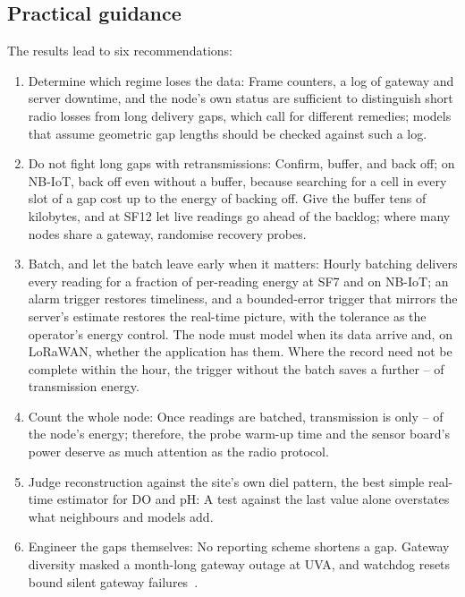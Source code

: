 \subsection{Practical guidance}
\label{sec:disc-guidance}
The results lead to six recommendations:
\begin{enumerate}
\item Determine which regime loses the data: Frame counters, a log of gateway and server downtime, and the node's own status are sufficient to distinguish short radio losses from long delivery gaps, which call for different remedies; models that assume geometric gap lengths should be checked against such a log.
\item Do not fight long gaps with retransmissions: Confirm, buffer, and back off; on NB-IoT, back off even without a buffer, because searching for a cell in every slot of a gap cost up to \backoffMax{} the energy of backing off. Give the buffer tens of kilobytes, and at SF12 let live readings go ahead of the backlog; where many nodes share a gateway, randomise recovery probes.
\item Batch, and let the batch leave early when it matters: Hourly batching delivers every reading for a fraction of per-reading energy at SF7 and on NB-IoT; an alarm trigger restores timeliness, and a bounded-error trigger that mirrors the server's estimate restores the real-time picture, with the tolerance as the operator's energy control. The node must model when its data arrive and, on LoRaWAN, whether the application has them. Where the record need not be complete within the hour, the trigger without the batch saves a further \noBatchSaveMin--\noBatchSaveMax{} of transmission energy.
\item Count the whole node: Once readings are batched, transmission is only \txShareFinalMin--\txShareFinalMax{} of the node's energy; therefore, the probe warm-up time and the sensor board's power deserve as much attention as the radio protocol.
\item Judge reconstruction against the site's own diel pattern, the best simple real-time estimator for DO and pH: A test against the last value alone overstates what neighbours and models add.
\item Engineer the gaps themselves: No reporting scheme shortens a gap. Gateway diversity masked a month-long gateway outage at UVA, and watchdog resets bound silent gateway failures~\cite{brzozowski2018lessons,ingelrest2010sensorscope}.
\end{enumerate}

